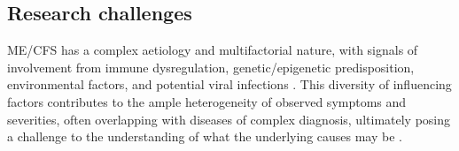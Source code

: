 

\subsection{Research challenges}
\label{subsec:research-challenges}


ME/CFS has a complex aetiology and multifactorial nature, with signals of involvement from immune dysregulation, genetic/epigenetic predisposition, environmental factors, and potential viral infections \citep{rivera2019MyalgicEncephalomyelitis}.
This diversity of influencing factors contributes to the ample heterogeneity of observed symptoms and severities, often overlapping with diseases of complex diagnosis, ultimately posing a challenge to the understanding of what the underlying causes may be \citep{malato2021Statisticalchallenges}.

